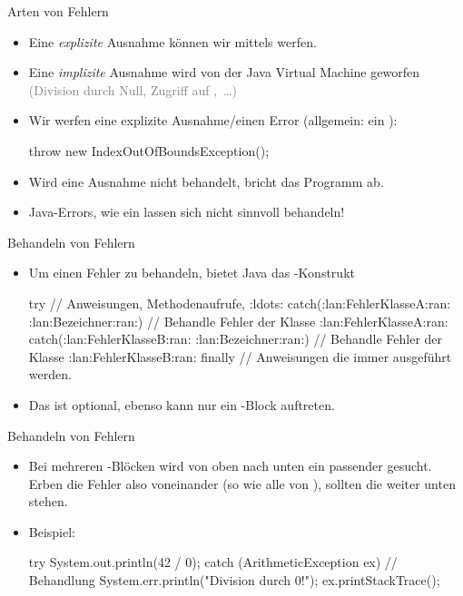 \begin{frame}[fragile]{Arten von Fehlern}
    \begin{itemize}[<+(1)->]
        \widei
        \item Eine \emph{explizite} Ausnahme können wir mittels  werfen.
        \item Eine \emph{implizite} Ausnahme wird von der Java Virtual Machine geworfen \textcolor{gray}{(Division durch Null, Zugriff auf ,~\ldots)}
        \item Wir werfen eine explizite Ausnahme/einen Error (allgemein: ein ): \pause{}
\begin{plainjava}
throw new IndexOutOfBoundsException();
\end{plainjava}
        \item Wird eine Ausnahme nicht behandelt, bricht das Programm ab.
        \item Java-Errors, wie ein  lassen sich nicht sinnvoll behandeln!
    \end{itemize}
\end{frame}

\begin{frame}[fragile]{Behandeln von Fehlern}
    \begin{itemize}[<+(1)->]
        \widei
        \item Um einen Fehler zu behandeln, bietet Java das -Konstrukt
\begin{plainjava}
try {
    // Anweisungen, Methodenaufrufe, :ldots:
} catch(:lan:FehlerKlasseA:ran: :lan:Bezeichner:ran:) {
    // Behandle Fehler der Klasse :lan:FehlerKlasseA:ran:
} catch(:lan:FehlerKlasseB:ran: :lan:Bezeichner:ran:) {
    // Behandle Fehler der Klasse :lan:FehlerKlasseB:ran:
} finally {
    // Anweisungen die immer ausgeführt werden.
}
\end{plainjava}
        \item Das  ist optional, ebenso kann nur ein -Block auftreten.
    \end{itemize}
\end{frame}


\begin{frame}[fragile]{Behandeln von Fehlern}
    \begin{itemize}[<+(1)->]
        \widei
        \item Bei mehreren -Blöcken wird von oben nach unten ein passender gesucht.\pause{} Erben die Fehler also voneinander (so wie alle von ),\pause{} sollten die  weiter unten stehen.
        \item Beispiel:\pause{}
\begin{plainjava}
try {
    System.out.println(42 / 0);
} catch (ArithmeticException ex) {
    // Behandlung
    System.err.println("Division durch 0!");
    ex.printStackTrace();
}
\end{plainjava}
    \end{itemize}
\end{frame}

